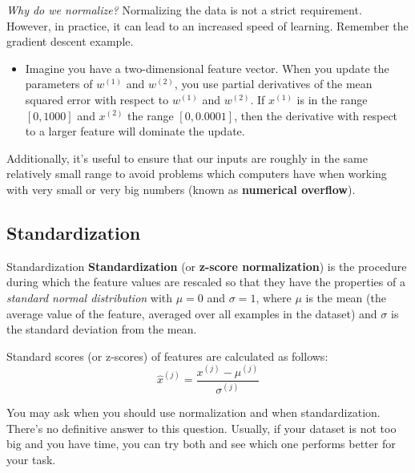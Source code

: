 \documentclass[9pt,dvipsnames]{beamer}
\begin{document}
	\begin{frame}
		\textit{Why do we normalize?} Normalizing the data is not a strict requirement. However, in practice, it can lead to an increased speed of learning. Remember the gradient descent example. 
		\begin{itemize}
			\item Imagine you have a two-dimensional feature vector. When you update the parameters of $w^{(1)}$ and $w^{(2)}$, you use partial derivatives of the mean squared error with respect to $w^{(1)}$ and $w^{(2)}$. If $x^{(1)}$ is in the range $[0,1000]$ and $x^{(2)}$ the range $[0,0.0001]$, then the derivative with respect to a larger feature will dominate the update.
		\end{itemize}
		Additionally, it's useful to ensure that our inputs are roughly in the same relatively small range to avoid problems which computers have when working with very small or very big numbers (known as \textbf{numerical overflow}).
	\end{frame}
	
	\subsection{Standardization}
	\begin{frame}{Standardization}
		\textbf{Standardization} (or \textbf{z-score normalization}) is the procedure during which the feature values are rescaled so that they have the properties of a \textit{standard normal distribution} with $\mu=0$ and $\sigma=1$, where $\mu$ is the mean (the average value of the feature, averaged over all examples in the dataset) and $\sigma$ is the standard deviation from the mean.
		
		Standard scores (or z-scores) of features are calculated as follows:
		$$
		\hat{x}^{(j)}=\frac{x^{(j)}-\mu^{(j)}}{\sigma^{(j)}}
		$$
		
		You may ask when you should use normalization and when standardization. There's no definitive answer to this question. Usually, if your dataset is not too big and you have time, you can try both and see which one performs better for your task.
	\end{frame}
	
\end{document}
